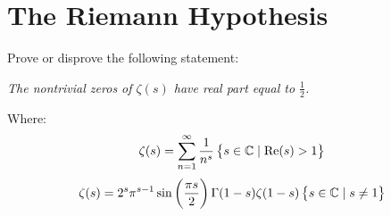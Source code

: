 \section*{The Riemann Hypothesis}
Prove or disprove the following statement:

\textit{The nontrivial zeros of $\zeta(s)$ have real part equal to $\frac{1}{2}$.}

Where:
\[\zeta(s) = \sum_{n=1}^\infty \frac{1}{n^s} \set{s \in \mathbb{C}\mid\operatorname{Re}(s) > 1 }\]
\[\zeta(s) = 2^s \pi^{s-1}\sin\left(\frac{\pi s}{2}\right) \Gamma(1 - s) \zeta(1-s) \set{s \in \mathbb{C}\mid s \neq 1}\]
